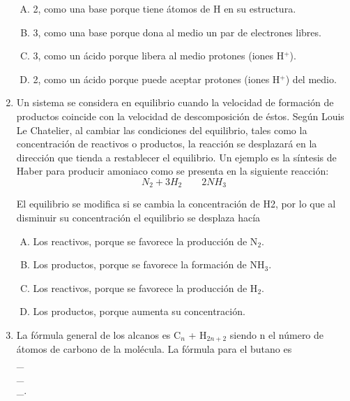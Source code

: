 \begin{enumerate}
\begin{enumerate}[(A)]
\item 2, como una base porque tiene átomos de H en su estructura.
\item  3, como una base porque dona al medio un par de electrones libres.
\item  3, como un ácido porque libera al medio protones (iones H$^{+}$).
\item 2, como un ácido porque puede aceptar protones (iones H$^{+}$) del medio.
\end{enumerate}


\newpage
\item Un sistema se considera en equilibrio cuando la velocidad de formación de productos coincide con la velocidad de descomposición de éstos. Según Louis Le Chatelier, al cambiar las condiciones del equilibrio, tales como la concentración de reactivos o productos, la reacción se desplazará en la dirección que tienda a restablecer el equilibrio. Un ejemplo es la síntesis de Haber para producir amoniaco como se presenta en la siguiente reacción: \label{mon-22}
\begin{equation*}
N_2 + 3H_2 \qquad  2NH_3 
\end{equation*}

El equilibrio se modifica si se cambia la concentración de 	H2, por lo que al disminuir su concentración el equilibrio se desplaza hacía

\begin{enumerate}[(A)]
\item Los reactivos, porque se favorece la producción de N$_2$.
\item  Los productos, porque se favorece la formación de NH$_3$.
\item  Los reactivos, porque se favorece la producción de H$_2$.
\item Los productos, porque aumenta su concentración.
\end{enumerate}



\item La fórmula general de los alcanos es C$_n$ + H$_{2n+2}$ siendo n el número de átomos de carbono de la molécula. La fórmula para el butano es  \label{mon-25}\hrulefill\\
\_\hrulefill\\
\_\hrulefill\\
\_\hrulefill.


\end{enumerate}
